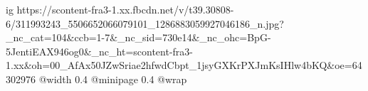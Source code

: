  
 
 
 
 

\ifcmt
  ig https://scontent-fra3-1.xx.fbcdn.net/v/t39.30808-6/311993243_5506652066079101_1286883059927046186_n.jpg?_nc_cat=104&ccb=1-7&_nc_sid=730e14&_nc_ohc=BpG-5JentiEAX946og0&_nc_ht=scontent-fra3-1.xx&oh=00_AfAx50JZwSriae2hfwdCbpt_1jsyGXKrPXJmKsIHlw4bKQ&oe=64302976
  @width 0.4
  @minipage 0.4
  @wrap \parpic[r]
\fi
